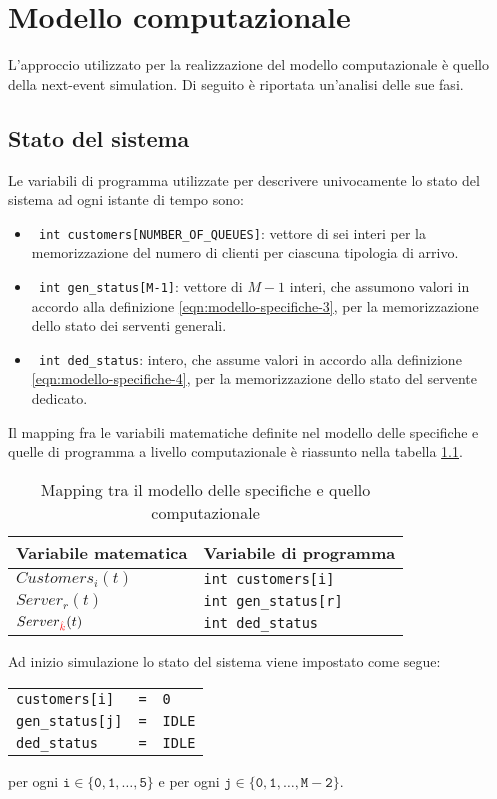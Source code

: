 \chapter{Modello computazionale}\label{chp:modello-computazionale}
L'approccio utilizzato per la realizzazione del modello computazionale è quello della next-event simulation. Di seguito è riportata un'analisi delle sue fasi.
\section{Stato del sistema}\label{sec:modello-computazionale-stato}
Le variabili di programma utilizzate per descrivere univocamente lo stato del sistema ad ogni istante di tempo sono:
\begin{itemize}
\item \texttt{{\color{code_purple} int} customers[NUMBER\_OF\_QUEUES]}: vettore di sei interi per la memorizzazione del numero di clienti per ciascuna tipologia di arrivo.
\item \texttt{{\color{code_purple} int} gen\_status[M-1]}: vettore di $M-1$ interi, che assumono valori in accordo alla definizione \ref{eqn:modello-specifiche-3}, per la memorizzazione dello stato dei serventi generali.
\item \texttt{{\color{code_purple} int} ded\_status}: intero, che assume valori in accordo alla definizione \ref{eqn:modello-specifiche-4}, per la memorizzazione dello stato del servente dedicato.
\end{itemize}

Il mapping fra le variabili matematiche definite nel modello delle specifiche e quelle di programma a livello computazionale è riassunto nella tabella \ref{table:modello-computazionale-1}. 

\begin{table}[ht]
\centering
{\tablecolors
\begin{tabular}{| l | l |}
\hline
Variabile matematica & Variabile di programma \\
\hline
$Customers_i(t)$ & \texttt{{\color{code_purple}int} customers[i]} \\
\hline
$Server_r(t)$ & \texttt{{\color{code_purple}int} gen\_status[r]} \\
\hline
$Server_{\color{red}\hat{k}}(t)$ & \texttt{{\color{code_purple}int} ded\_status} \\
\hline
\end{tabular}}
\caption{Mapping tra il modello delle specifiche e quello computazionale}
\label{table:modello-computazionale-1}
\end{table}
\newpage
Ad inizio simulazione lo stato del sistema viene impostato come segue:
\begin{center}
\begin{tabular}{l l l}
\texttt{customers[i]} & \texttt{=} & \texttt{0} \\
\texttt{gen\_status[j]} & \texttt{=} & \texttt{IDLE} \\
\texttt{ded\_status} & \texttt{=} & \texttt{IDLE}
\end{tabular}
\end{center}
per ogni $\mathtt{i\in \lbrace 0, 1, \dots, 5 \rbrace}$ e per ogni $\mathtt{j\in \lbrace 0, 1, \dots, M-2 \rbrace}$.

